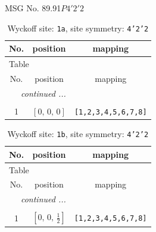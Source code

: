 \documentclass[fleqn,8pt]{jsarticle}
\begin{document}
\setcounter{MaxMatrixCols}{32}

\renewcommand{\tablename}{Table~}
\renewcommand{\figurename}{Figure~}
\begin{center}
\LARGE
MSG No. 89.91\quad$P4'2'2$
\end{center}
\renewcommand{\arraystretch}{1.2}
\begin{longtable}{ccc}
\caption{Wyckoff site: {\tt 1a}, site symmetry: {\tt 4'2'2}}
 \\
 \hline \hline
No. & position & mapping \\ \hline \endfirsthead

\multicolumn{2}{l}{\tablename\ \thetable{}} \\
 \hline \hline
No. & position & mapping \\ \hline \endhead

 \hline \hline
\multicolumn{2}{r}{\footnotesize\it continued ...} \\ \endfoot

 \hline \hline
\multicolumn{2}{r}{} \\ \endlastfoot

1 & $\left[ 0,\, 0,\, 0 \right]$ & {\tt [1,2,3,4,5,6,7,8]} \\
\end{longtable}
\renewcommand{\arraystretch}{1.2}
\begin{longtable}{ccc}
\caption{Wyckoff site: {\tt 1b}, site symmetry: {\tt 4'2'2}}
 \\
 \hline \hline
No. & position & mapping \\ \hline \endfirsthead

\multicolumn{2}{l}{\tablename\ \thetable{}} \\
 \hline \hline
No. & position & mapping \\ \hline \endhead

 \hline \hline
\multicolumn{2}{r}{\footnotesize\it continued ...} \\ \endfoot

 \hline \hline
\multicolumn{2}{r}{} \\ \endlastfoot

1 & $\left[ 0,\, 0,\, \frac{1}{2} \right]$ & {\tt [1,2,3,4,5,6,7,8]} \\
\end{longtable}
\renewcommand{\arraystretch}{1.2}
\end{document}
